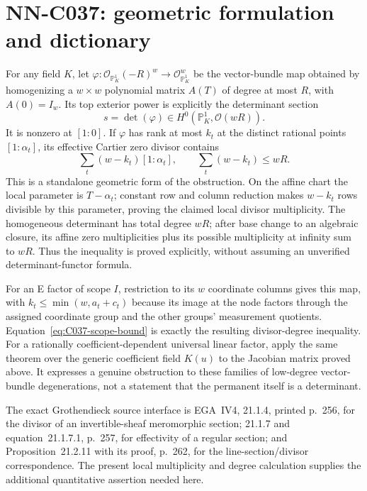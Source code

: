 \section{NN-C037: geometric formulation and dictionary}
\begin{geometricstatement}[NN-C037]
For any field $K$, let $\varphi:\mathcal O_{\mathbb P^1_K}(-R)^w\to\mathcal O_{\mathbb P^1_K}^{w}$ be the vector-bundle map obtained by homogenizing a $w\times w$ polynomial matrix $A(T)$ of degree at most $R$, with $A(0)=I_w$. Its top exterior power is explicitly the determinant section
\[
                   s=\det(\varphi)\in
                     H^0(\mathbb P^1_K,\mathcal O(wR)).
\]
It is nonzero at $[1:0]$. If $\varphi$ has rank at most $k_t$ at the distinct rational points $[1:\alpha_t]$, its effective Cartier zero divisor contains
\[
                        \sum_t(w-k_t)[1:\alpha_t],
                         \qquad \sum_t(w-k_t)\le wR.
\]
This is a standalone geometric form of the obstruction. On the affine chart the local parameter is $T-\alpha_t$; constant row and column reduction makes $w-k_t$ rows divisible by this parameter, proving the claimed local divisor multiplicity. The homogeneous determinant has total degree $wR$; after base change to an algebraic closure, its affine zero multiplicities plus its possible multiplicity at infinity sum to $wR$. Thus the inequality is proved explicitly, without assuming an unverified determinant-functor formula.

For an E factor of scope $I$, restriction to its $w$ coordinate columns gives this map, with $k_t\le\min(w,a_t+c_t)$ because its image at the node factors through the assigned coordinate group and the other groups' measurement quotients. Equation~\eqref{eq:C037-scope-bound} is exactly the resulting divisor-degree inequality. For a rationally coefficient-dependent universal linear factor, apply the same theorem over the generic coefficient field $K(u)$ to the Jacobian matrix proved above. It expresses a genuine obstruction to these families of low-degree vector-bundle degenerations, not a statement that the permanent itself is a determinant.

The exact Grothendieck source interface is EGA~IV4, 21.1.4, printed p.~256, for the divisor of an invertible-sheaf meromorphic section; 21.1.7 and equation~21.1.7.1, p.~257, for effectivity of a regular section; and Proposition~21.2.11 with its proof, p.~262, for the line-section/divisor correspondence. The present local multiplicity and degree calculation supplies the additional quantitative assertion needed here.


\end{geometricstatement}
